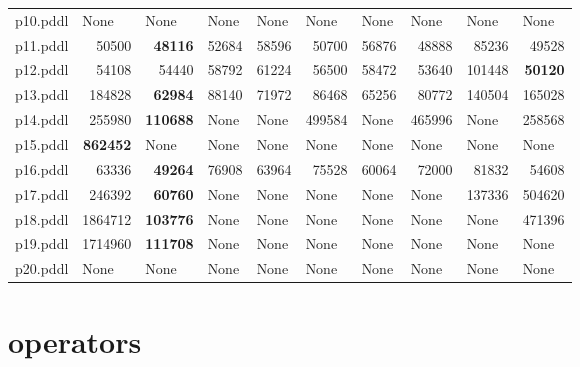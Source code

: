 \documentclass{article}
\begin{document}
\begin{tabular}{@{}lrrrrrrrrr@{}}
p10.pddl & \multicolumn{1}{|l|}{None} & \multicolumn{1}{|l|}{None} & \multicolumn{1}{|l|}{None} & \multicolumn{1}{|l|}{None} & \multicolumn{1}{|l|}{None} & \multicolumn{1}{|l|}{None} & \multicolumn{1}{|l|}{None} & \multicolumn{1}{|l|}{None} & \multicolumn{1}{|l|}{None} \\
p11.pddl & 50500 & \textbf{48116} & 52684 & 58596 & 50700 & 56876 & 48888 & 85236 & 49528 \\
p12.pddl & 54108 & 54440 & 58792 & 61224 & 56500 & 58472 & 53640 & 101448 & \textbf{50120} \\
p13.pddl & 184828 & \textbf{62984} & 88140 & 71972 & 86468 & 65256 & 80772 & 140504 & 165028 \\
p14.pddl & 255980 & \textbf{110688} & \multicolumn{1}{|l|}{None} & \multicolumn{1}{|l|}{None} & 499584 & \multicolumn{1}{|l|}{None} & 465996 & \multicolumn{1}{|l|}{None} & 258568 \\
p15.pddl & \textbf{862452} & \multicolumn{1}{|l|}{None} & \multicolumn{1}{|l|}{None} & \multicolumn{1}{|l|}{None} & \multicolumn{1}{|l|}{None} & \multicolumn{1}{|l|}{None} & \multicolumn{1}{|l|}{None} & \multicolumn{1}{|l|}{None} & \multicolumn{1}{|l|}{None} \\
p16.pddl & 63336 & \textbf{49264} & 76908 & 63964 & 75528 & 60064 & 72000 & 81832 & 54608 \\
p17.pddl & 246392 & \textbf{60760} & \multicolumn{1}{|l|}{None} & \multicolumn{1}{|l|}{None} & \multicolumn{1}{|l|}{None} & \multicolumn{1}{|l|}{None} & \multicolumn{1}{|l|}{None} & 137336 & 504620 \\
p18.pddl & 1864712 & \textbf{103776} & \multicolumn{1}{|l|}{None} & \multicolumn{1}{|l|}{None} & \multicolumn{1}{|l|}{None} & \multicolumn{1}{|l|}{None} & \multicolumn{1}{|l|}{None} & \multicolumn{1}{|l|}{None} & 471396 \\
p19.pddl & 1714960 & \textbf{111708} & \multicolumn{1}{|l|}{None} & \multicolumn{1}{|l|}{None} & \multicolumn{1}{|l|}{None} & \multicolumn{1}{|l|}{None} & \multicolumn{1}{|l|}{None} & \multicolumn{1}{|l|}{None} & \multicolumn{1}{|l|}{None} \\
p20.pddl & \multicolumn{1}{|l|}{None} & \multicolumn{1}{|l|}{None} & \multicolumn{1}{|l|}{None} & \multicolumn{1}{|l|}{None} & \multicolumn{1}{|l|}{None} & \multicolumn{1}{|l|}{None} & \multicolumn{1}{|l|}{None} & \multicolumn{1}{|l|}{None} & \multicolumn{1}{|l|}{None} \\
\end{tabular}

\hypertarget{operators}{}
\section*{operators}
\end{document}
